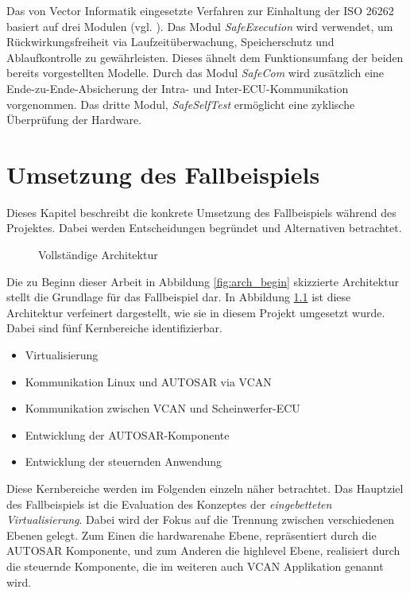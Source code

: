\documentclass[
  a4paper,					    %
  twoside,
  DIV=calc,     				%
  bibliography=totoc,
  cleardoublepage=empty,
  ngerman,     					%
  final       					%
]{scrbook}
\begin{document}
Das von Vector Informatik eingesetzte Verfahren zur Einhaltung der ISO 26262 basiert auf drei Modulen (vgl. \cite{microsar}). Das Modul \emph{SafeExecution} wird verwendet, um Rückwirkungsfreiheit via Laufzeitüberwachung, Speicherschutz und Ablaufkontrolle zu gewährleisten. Dieses ähnelt dem Funktionsumfang der beiden bereits vorgestellten Modelle. Durch das Modul \emph{SafeCom} wird zusätzlich eine Ende-zu-Ende-Absicherung der Intra- und Inter-ECU-Kommunikation vorgenommen. Das dritte Modul, \emph{SafeSelfTest} ermöglicht eine zyklische Überprüfung der Hardware.









\chapter{Umsetzung des Fallbeispiels}
\label{sec:Umsetzung_Fallbeispiel}
Dieses Kapitel beschreibt die konkrete Umsetzung des Fallbeispiels während des Projektes. Dabei werden Entscheidungen begründet und Alternativen betrachtet.

\begin{figure}[ht]
    \centering
    
    \caption{Vollständige Architektur}
    \label{fig:arch_finished}
\end{figure}

Die zu Beginn dieser Arbeit in Abbildung \ref{fig:arch_begin} skizzierte Architektur stellt die Grundlage für das Fallbeispiel dar. In Abbildung \ref{fig:arch_finished} ist diese Architektur verfeinert dargestellt, wie sie in diesem Projekt umgesetzt wurde. Dabei sind fünf Kernbereiche identifizierbar.

\begin{itemize}
    \item Virtualisierung
    \item Kommunikation Linux und AUTOSAR via VCAN
    \item Kommunikation zwischen VCAN und Scheinwerfer-ECU
    \item Entwicklung der AUTOSAR-Komponente
    \item Entwicklung der steuernden Anwendung
\end{itemize}

Diese Kernbereiche werden im Folgenden einzeln näher betrachtet. Das Hauptziel des Fallbeispiels ist die Evaluation des Konzeptes der \emph{eingebetteten Virtualisierung}. Dabei wird der Fokus auf die Trennung zwischen verschiedenen Ebenen gelegt. Zum Einen die hardwarenahe Ebene, repräsentiert durch die AUTOSAR Komponente, und zum Anderen die highlevel Ebene, realisiert durch die steuernde Komponente, die im weiteren auch VCAN Applikation genannt wird.
\end{document}
